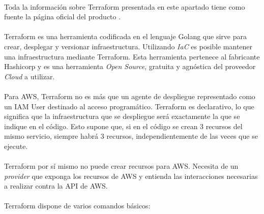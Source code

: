\documentclass[../../memoria.tex]{subfiles}
\begin{document}
\paragraph{}
Toda la información sobre Terraform presentada en este apartado tiene como fuente la página oficial del producto \cite{terraform}.

\paragraph{}
Terraform es una herramienta codificada en el lenguaje Golang que sirve para crear, desplegar y versionar infraestructura. Utilizando \textit{IaC} es posible mantener una infraestructura mediante Terraform. Esta herramienta pertenece al fabricante Hashicorp y es una herramienta \textit{Open Source}, gratuita y agnóstica del proveedor \textit{Cloud} a utilizar.

\paragraph{}
Para AWS, Terraform no es más que un agente de despliegue representado como un IAM User destinado al acceso programático. Terraform es declarativo, lo que significa que la infraestructura que se despliegue será exactamente la que se indique en el código. Esto supone que, si en el código se crean 3 recursos del mismo servicio, siempre habrá 3 recursos, independientemente de las veces que se ejecute.

\paragraph{}
Terraform por sí mismo no puede crear recursos para AWS. Necesita de un \textit{provider} que exponga los recursos de AWS y entienda las interacciones necesarias a realizar contra la API de AWS.

\paragraph{}
Terraform dispone de varios comandos básicos:
\end{document}
